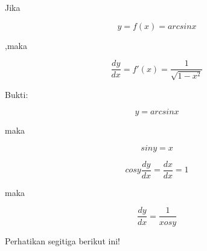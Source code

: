 \documentclass{article}
\begin{document}
\begin{eulernotebook}
\begin{eulercomment}
\begin{eulercomment}
\begin{eulercomment}
\end{eulercomment}
\begin{eulercomment}
Jika\\
\end{eulercomment}
\begin{eulerformula}
\[
y=f(x)=arcsinx
\]
\end{eulerformula}
\begin{eulercomment}
,maka\\
\end{eulercomment}
\begin{eulerformula}
\[
\frac{dy}{dx} = f'(x)= \frac{1}{\sqrt{1-x^2}}
\]
\end{eulerformula}
\begin{eulercomment}
Bukti:\\
\end{eulercomment}
\begin{eulerformula}
\[
y=arcsinx
\]
\end{eulerformula}
\begin{eulercomment}
maka\\
\end{eulercomment}
\begin{eulerformula}
\[
siny=x
\]
\end{eulerformula}
\begin{eulercomment}
\end{eulercomment}
\begin{eulerformula}
\[
cosy \frac{dy}{dx}= \frac{dx}{dx}=1
\]
\end{eulerformula}
\begin{eulercomment}
maka\\
\end{eulercomment}
\begin{eulerformula}
\[
\frac{dy}{dx} = \frac{1}{xosy}
\]
\end{eulerformula}
\begin{eulercomment}
Perhatikan segitiga berikut ini!

\end{eulercomment}
\begin{eulercomment}


\end{eulercomment}
\end{eulercomment}
\end{eulercomment}
\end{eulernotebook}
\end{document}
